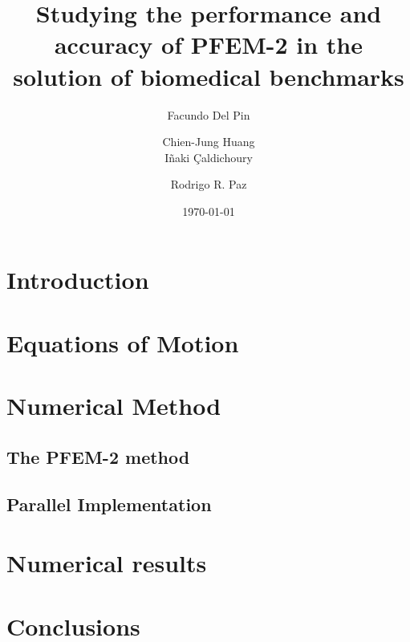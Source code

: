 \documentclass[twocolumn]{svjour3}          %
\begin{document}
\title{Studying the performance and accuracy of PFEM-2 in the solution of biomedical benchmarks}
\author{Facundo Del Pin \and Chien-Jung Huang \\ I\~naki \c{C}aldichoury \and Rodrigo R. Paz}
\date{\today}

\maketitle

\begin{abstract}

\end{abstract}

\section{Introduction}


\section{Equations of Motion}


\section{Numerical Method}
  
 \subsection{The PFEM-2 method}
  
 \subsection{Parallel Implementation}
  

\section{Numerical results}



\section{Conclusions}


\begin{thebibliography}{9}
  
\end{thebibliography}
\end{document}
